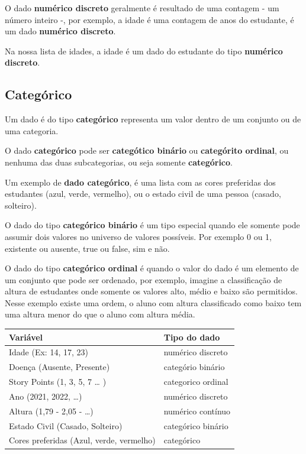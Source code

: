 \documentclass[
]{book}
\begin{document}
O dado \textbf{numérico discreto} geralmente é resultado de uma contagem - um número inteiro -, por exemplo, a idade é uma contagem de anos do estudante, é um dado \textbf{numérico discreto}.

Na nossa lista de idades, a idade é um dado do estudante do tipo \textbf{numérico discreto}.

\hypertarget{categuxf3rico}{%
\subsection{Categórico}\label{categuxf3rico}}

Um dado é do tipo \textbf{categórico} representa um valor dentro de um conjunto ou de uma categoria.

O dado \textbf{categórico} pode ser \textbf{categótico binário} ou \textbf{categórito ordinal}, ou nenhuma das duas subcategorias, ou seja somente \textbf{categórico}.

Um exemplo de \textbf{dado categórico}, é uma lista com as cores preferidas dos estudantes (azul, verde, vermelho), ou o estado civil de uma pessoa (casado, solteiro).

O dado do tipo \textbf{categórico binário} é um tipo especial quando ele somente pode assumir dois valores no universo de valores possíveis. Por exemplo 0 ou 1, existente ou ausente, true ou false, sim e não.

O dado do tipo \textbf{categórico ordinal} é quando o valor do dado é um elemento de um conjunto que pode ser ordenado, por exemplo, imagine a classificação de altura de estudantes onde somente os valores alto, médio e baixo são permitidos. Nesse exemplo existe uma ordem, o aluno com altura classificado como baixo tem uma altura menor do que o aluno com altura média.

\begin{longtable}[]{@{}ll@{}}
\toprule\noalign{}
Variável & Tipo do dado \\
\midrule\noalign{}
\endhead
\bottomrule\noalign{}
\endlastfoot
Idade (Ex: 14, 17, 23) & numérico discreto \\
Doença (Ausente, Presente) & categório binário \\
Story Points (1, 3, 5, 7 \ldots{} ) & categorico ordinal \\
Ano (2021, 2022, \ldots) & numérico discreto \\
Altura (1,79 - 2,05 - \ldots) & numérico contínuo \\
Estado Civil (Casado, Solteiro) & categórico binário \\
Cores preferidas (Azul, verde, vermelho) & categórico \\
\end{longtable}
\end{document}
